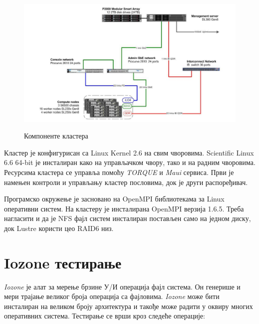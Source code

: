  \begin{figure}[h!]
   \centering
       \includegraphics[width=1\textwidth]{slike/medflow.png}\\[1cm]
   \caption{Компоненте кластера}
 \end{figure}
 
Кластер је конфигурисан са Linux Kernel 2.6 на свим чворовима. Scientific Linux 6.6 64-bit је инсталиран како на управљачком чвору, тако и на радним чворовима. Ресурсима кластера се управља помоћу \textit{TORQUE} и \textit{Maui} сервиса. Први је намењен контроли и управљању кластер пословима, док је други распоређивач. 
 
Програмско окружење је засновано на OpenMPI библиотекама за Linux оперативни систем. На кластеру је инсталирана OpenMPI верзија 1.6.5. Треба нагласити и да је \gls{NFS} фајл систем инсталиран постављен само на једном диску, док Lustre користи цео RAID6 низ. 

\section{Iozone тестирање}
\textit{Iozone} је алат за мерење брзине У/И операција фајл система. Он генерише и мери трајање великог броја операција са фајловима. \textit{Iozone} може бити  инсталиран на великом броју архитектура и такође може радити у оквиру многих оперативних система. Тестирање се врши кроз следеће операције:

